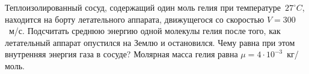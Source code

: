 
Теплоизолированный сосуд, содержащий один моль гелия при температуре~$27^{\circ}C$, 
находится на борту летательного аппарата, движущегося со скоростью $V = 300$~м/с. Подсчитать 
среднюю энергию одной молекулы гелия после того, как летательный аппарат опустился на Землю и 
остановился. Чему равна при этом внутренняя энергия газа в сосуде? Молярная масса гелия равна $\mu =4 \cdot 10^{-3}$~кг/моль. 